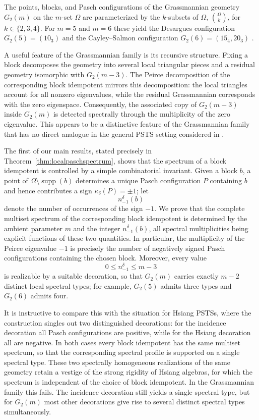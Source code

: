 \documentclass[times,11pt,reqno]{amsproc}
\theoremstyle{definition}
\numberwithin{equation}{section}
\DeclareMathOperator{\supp}{supp}
\begin{document}
The points, blocks, and Pasch configurations of the Grassmannian geometry $G_2(m)$ on the $m$-set $\Omega$ are parameterized by the $k$-subsets of $\Omega$, $\binom{\Omega}{k}$, for $k \in \{2, 3, 4\}$.
For $m = 5$ and $m = 6$ these yield the Desargues configuration
$G_2(5)=(10_3)$ and the Cayley--Salmon configuration $G_2(6)=(15_4,20_3)$ \cite{Petelczyc-Prazmowska-Prazmowska}.


A useful feature of the Grassmannian family is its recursive
structure. Fixing a block decomposes the geometry into several local
triangular pieces and a residual geometry isomorphic with
$G_2(m-3)$. The Peirce decomposition of the corresponding block idempotent mirrors
this decomposition: the local triangles account for all nonzero
eigenvalues, while the residual Grassmannian corresponds with the
zero eigenspace. Consequently, the associated copy of $G_2(m-3)$ inside
$G_2(m)$ is detected spectrally through the multiplicity of the zero
eigenvalue. This appears to be a distinctive
feature of the Grassmannian family that has no direct analogue in the
general PSTS setting considered in \cite{Fox-Tka2026b}.

The first of our main results, stated precisely in Theorem~\ref{thm:localpaschspectrum}, shows that the spectrum of a block idempotent is controlled by a simple combinatorial invariant. Given a block $b$, a point of $\Omega\setminus\supp(b)$ determines a unique Pasch configuration $P$ containing $b$ and hence contributes a sign $\kappa_\delta(P) = \pm1$; let
$$
n_{-1}^{\delta}(b)
$$
denote the number of occurrences of the sign $-1$. We prove that the complete multiset spectrum of the corresponding block idempotent is determined by the ambient parameter $m$ and the integer $n_{-1}^{\delta}(b)$, all spectral multiplicities being explicit functions of these two quantities. In particular, the multiplicity of the Peirce eigenvalue $-1$ is precisely the number of negatively signed Pasch configurations containing the chosen block. Moreover, every value
$$
0\le n_{-1}^{\delta}\le m-3
$$
is realizable by a suitable decoration, so that $G_2(m)$ carries exactly $m-2$ distinct local spectral types; for example, $G_2(5)$ admits three types and $G_2(6)$ admits four.

It is instructive to compare this with the situation for Hsiang PSTSs, where the construction singles out two distinguished decorations: for the incidence decoration all Pasch configurations are positive, while for the Hsiang decoration all are negative. In both cases every block idempotent has the same multiset spectrum, so that the corresponding spectral profile is supported on a single spectral type. These two spectrally homogeneous realizations of the same geometry retain a vestige of the strong rigidity of Hsiang algebras, for which the spectrum is independent of the choice of block idempotent. In the Grassmannian family this fails. The incidence decoration still yields a single spectral type, but for $G_2(m)$ most other decorations give rise to several distinct spectral types simultaneously.
\end{document}
